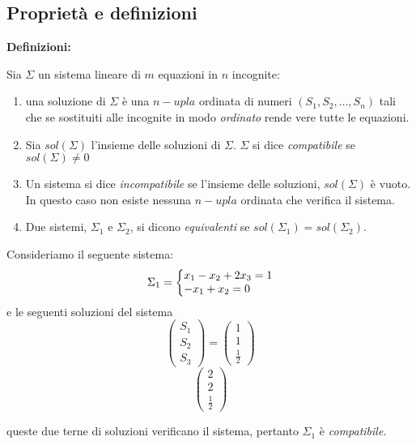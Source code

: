 \documentclass[a4paper]{article}
\makeatletter
\newenvironment{sistema}%
{\left\lbrace\begin{array}{{@{}l@{}l@{}l@{}l@{}}}}%
	{\end{array}\right.}
\newcommand{\ns}{\par \noindent}
\makeatother
\begin{document}
\subsection{Proprietà e definizioni}
\textbf{Definizioni: }
\ns
Sia $\Sigma$ un sistema lineare di $m$ equazioni in $n$ incognite:
\begin{enumerate}
	\item una soluzione di $\Sigma$ è una $n-upla$ ordinata di numeri $(S_1, S_2, \dots , S_n)$ tali che se sostituiti alle incognite in modo \textit{ordinato} rende vere tutte le equazioni.
	\item Sia $sol(\Sigma)$ l'insieme delle soluzioni di $\Sigma$. $\Sigma$ si dice \textit{compatibile} se $sol(\Sigma) \neq 0$
	\item Un sistema si dice \textit{incompatibile} se l'insieme delle soluzioni, $sol(\Sigma)$ è vuoto. In questo caso non esiste nessuna $n-upla$ ordinata che verifica il sistema.
	\item Due sistemi, $\Sigma_1$ e $\Sigma_2$, si dicono \textit{equivalenti} se $sol(\Sigma_1) = sol(\Sigma_2)$.
\end{enumerate}
Consideriamo il seguente sistema:
\begin{equation*}
	\Sigma_1 =
	\begin{sistema}
		x_1 - x_2 +2x_3 =1 \\
		-x_1 +x_2 = 0
	\end{sistema}
\end{equation*}
e le seguenti soluzioni del sistema
\begin{equation*}
	\begin{pmatrix}
		S_{1} \\
		S_2 \\
		S_3
	\end{pmatrix}
	=
	\begin{pmatrix}
		1 \\
		1 \\
		\frac{1}{2}
	\end{pmatrix}
	\end{equation*}
\begin{equation*}
	\begin{pmatrix}
		2 \\
		2 \\
		\frac{1}{2}
	\end{pmatrix}
\end{equation*}
\begin{center}
queste due terne di soluzioni verificano il sistema, pertanto $\Sigma_1$ è \textit{compatibile}.
\end{center}
\end{document}
